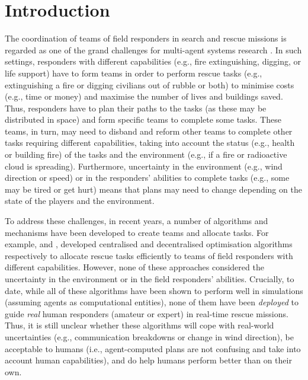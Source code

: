 \section{Introduction}
The coordination of teams of field responders in search and rescue missions is regarded as one  of the grand challenges for multi-agent systems research \cite{kitano}. In such settings, responders with different capabilities (e.g., fire extinguishing, digging, or life support) have to form teams in order to perform rescue tasks (e.g., extinguishing a fire or digging civilians out of rubble or both) to minimise  costs (e.g., time or money) and maximise the number of lives and buildings saved. Thus, responders have to plan their paths to the tasks (as these may be distributed in space) and form specific teams  to complete some tasks. These teams, in turn, may  need to disband and reform other teams to complete other tasks requiring different capabilities, taking into account the status (e.g., health or building fire) of the tasks and the environment (e.g., if a fire or radioactive cloud is spreading). Furthermore, uncertainty in the environment (e.g., wind direction or speed) or in the responders' abilities to complete tasks (e.g., some may be tired or get hurt) means that plans may need to change depending on the state of the players and the environment. 

To address these challenges, in recent years, a number of algorithms and mechanisms have been developed to create teams and allocate tasks. For example, \cite{ramchurn:teal:2010,koes:teal:2005,scerri:teal:200X} and \cite{ramchurn:robocup:2010,chapman:teal:2010}, developed centralised and decentralised optimisation algorithms respectively to allocate rescue tasks efficiently to teams of field responders with different capabilities. However, none of these approaches considered the uncertainty in the environment or in the field responders' abilities. Crucially, to date, while all of these algorithms have been shown to perform well in simulations (assuming agents as computational entities), none of them have been \emph{deployed} to guide \emph{real} human responders (amateur or expert) in real-time rescue missions. Thus, it is still unclear whether these algorithms will cope with real-world uncertainties (e.g., communication breakdowns or change in wind direction), be acceptable to humans (i.e., agent-computed plans are not confusing and take into account human capabilities), and do help humans perform better than on their own.

